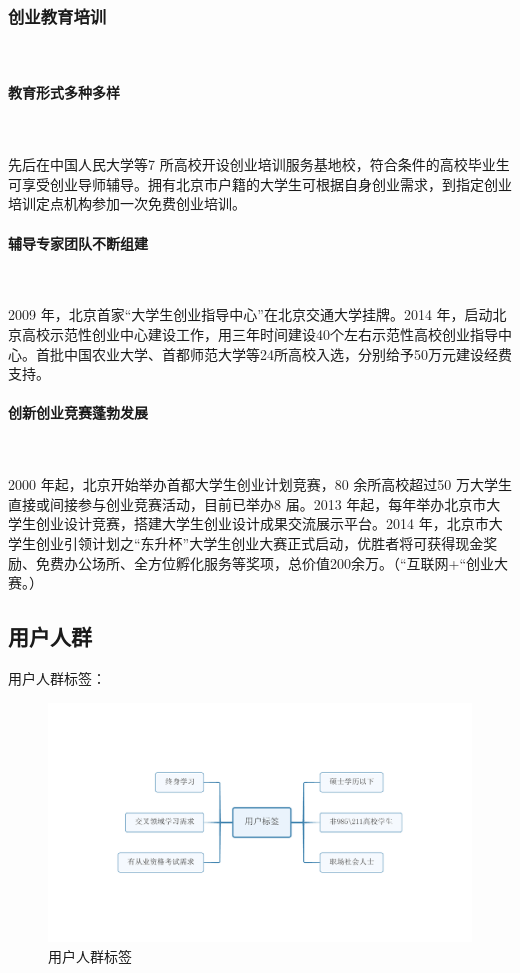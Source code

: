 \subsubsection{创业教育培训}\

\paragraph{教育形式多种多样}\

先后在中国人民大学等7 所高校开设创业培训服务基地校，符合条件的高校毕业生可享受创业导师辅导。拥有北京市户籍的大学生可根据自身创业需求，到指定创业培训定点机构参加一次免费创业培训。

\paragraph{辅导专家团队不断组建}\

2009 年，北京首家“大学生创业指导中心”在北京交通大学挂牌。2014 年，启动北京高校示范性创业中心建设工作，用三年时间建设40个左右示范性高校创业指导中心。首批中国农业大学、首都师范大学等24所高校入选，分别给予50万元建设经费支持。

\paragraph{创新创业竞赛蓬勃发展}\

2000 年起，北京开始举办首都大学生创业计划竞赛，80 余所高校超过50 万大学生直接或间接参与创业竞赛活动，目前已举办8 届。2013 年起，每年举办北京市大学生创业设计竞赛，搭建大学生创业设计成果交流展示平台。2014 年，北京市大学生创业引领计划之“东升杯”大学生创业大赛正式启动，优胜者将可获得现金奖励、免费办公场所、全方位孵化服务等奖项，总价值200余万。（“互联网+“创业大赛。）

\subsection{用户人群}
用户人群标签：
\begin{figure}[H]
	\centering
	\includegraphics[width=0.9\columnwidth]{figures/user_label}
	\caption{用户人群标签}
	\label{fg:user_label}
\end{figure}

